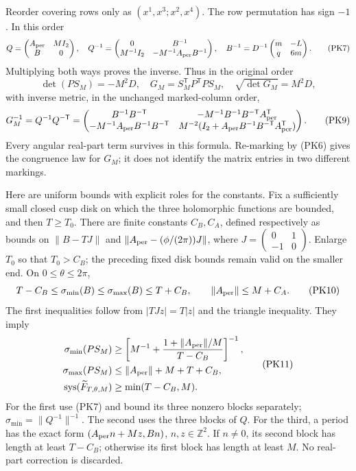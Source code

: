 \documentclass[11pt]{article}
\begin{document}
Reorder covering rows only as \((x^1,x^3;x^2,x^4)\). The row permutation
has sign \(-1\). In this order
\[
 Q=\begin{pmatrix}A_{\rm per}&MI_2\\B&0\end{pmatrix},\quad
 Q^{-1}=\begin{pmatrix}0&B^{-1}\\M^{-1}I_2&-M^{-1}A_{\rm per}B^{-1}\end{pmatrix},
 \quad B^{-1}=D^{-1}\begin{pmatrix}m&-L\\q&6m\end{pmatrix}.
 \tag{PK7}
\]
Multiplying both ways proves the inverse. Thus in the original order
\[
 \det(PS_M)=-M^2D,\quad
 G_M=S_M^{\mathsf T}P^{\mathsf T}PS_M,\quad
 \sqrt{\det G_M}=M^2D,
 \tag{PK8}
\]
with inverse metric, in the unchanged marked-column order,
\[
 G_M^{-1}=Q^{-1}Q^{-\mathsf T}
 =\begin{pmatrix}
 B^{-1}B^{-\mathsf T}&-M^{-1}B^{-1}B^{-\mathsf T}A_{\rm per}^{\mathsf T}\\
 -M^{-1}A_{\rm per}B^{-1}B^{-\mathsf T}&
 M^{-2}(I_2+A_{\rm per}B^{-1}B^{-\mathsf T}A_{\rm per}^{\mathsf T})
 \end{pmatrix}.
 \tag{PK9}
\]
Every angular real-part term survives in this formula. Re-marking by
(PK6) gives the congruence law for \(G_M\); it does not identify the
matrix entries in two different markings.

Here are uniform bounds with explicit roles for the constants. Fix a
sufficiently small closed cusp disk on which the three holomorphic
functions are bounded, and then \(T\ge T_0\). There are finite constants
\(C_B,C_A\), defined respectively as bounds on
\(\|B-TJ\|\) and
\(\|A_{\rm per}-(\phi/(2\pi))J\|\), where
\(J=\left(\begin{smallmatrix}0&1\\-1&0\end{smallmatrix}\right)\).
Enlarge \(T_0\) so that \(T_0>C_B\); the preceding fixed disk bounds
remain valid on the smaller end.
On \(0\le\theta\le2\pi\),
\[
 T-C_B\le\sigma_{\min}(B)\le\sigma_{\max}(B)\le T+C_B,
 \qquad \|A_{\rm per}\|\le M+C_A.
 \tag{PK10}
\]
The first inequalities follow from \(|TJz|=T|z|\) and the triangle
inequality. They imply
\[
 \begin{split}
 \sigma_{\min}(PS_M)&\ge
 \left[M^{-1}+\frac{1+\|A_{\rm per}\|/M}{T-C_B}\right]^{-1},\\
 \sigma_{\max}(PS_M)&\le \|A_{\rm per}\|+M+T+C_B,\\
 \operatorname{sys}(\widetilde F_{T,\theta,M})&\ge\min(T-C_B,M).
 \end{split}\tag{PK11}
\]
For the first use (PK7) and bound its three nonzero blocks separately;
\(\sigma_{\min}=\|Q^{-1}\|^{-1}\). The second uses the three blocks of
\(Q\). For the third, a period has the exact form
\((A_{\rm per}n+Mz,Bn)\), \(n,z\in\mathbb Z^2\). If \(n\ne0\),
its second block has length at least \(T-C_B\); otherwise its first
block has length at least \(M\). No real-part correction is discarded.
\end{document}
